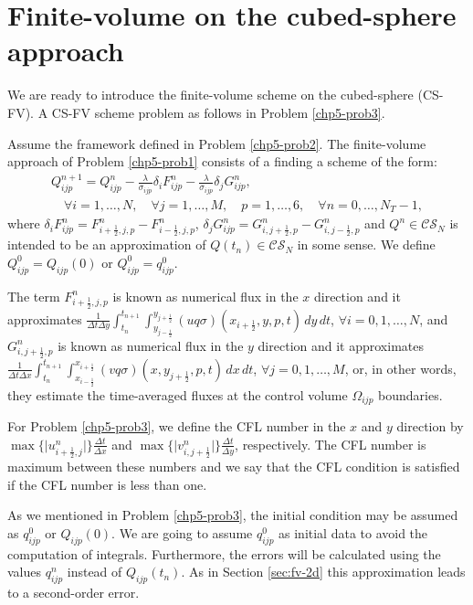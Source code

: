 \section{Finite-volume on the cubed-sphere approach}
\label{chp-cs-fvcs}
We are ready to introduce the finite-volume scheme on the cubed-sphere (CS-FV).
A CS-FV scheme problem as follows in Problem \ref{chp5-prob3}.
\begin{prob}[CS-FV scheme]
	\label{chp5-prob3}
	Assume the framework defined in Problem \ref{chp5-prob2}.
	The finite-volume approach of Problem \ref{chp5-prob1}
	consists of a finding a scheme of the form:
	\begin{align}
		\label{chp5-csfv}
		{Q}_{ijp}^{n+1} =  {Q}_{ijp}^{n} - \frac{\lambda}{\sigma_{ijp}}\delta_i {F}_{ijp}^{n}
		- \frac{\lambda}{\sigma_{ijp}} \delta_j {G}_{ijp}^{n},
		\\ \nonumber \quad \forall i = 1, \ldots, N, \quad \forall j = 1, \ldots, M, \quad p =1, \ldots, 6,
		\quad \forall n = 0, \ldots, N_T-1,
	\end{align}
	where $ \delta_i F_{ijp}^n =
	{F}_{i+\frac{1}{2},j,p}^{n} 
	- {F}_{i-\frac{1}{2},j,p}^{n}$,
	$ \delta_j G_{ijp}^n =
	{G}_{i,j+\frac{1}{2},p}^{n} 
	- {G}_{i,j-\frac{1}{2},p}^{n}$ 
	and ${Q}^{n}\in \mathcal{CS}_N$ is intended to be an approximation
	of ${Q}(t_{n})\in \mathcal{CS}_N$ in some sense. We define ${Q}_{ijp}^{0} = {Q}_{ijp}(0)$ or
	${Q}_{ijp}^{0} = {q}^0_{ijp}$.
	
	The term ${F}_{i+\frac{1}{2}, j, p}^{n}$ is known as numerical flux in the 
	$x$ direction and it approximates
	$\frac{1}{\Delta t \Delta y}\int_{t_n}^{t_{n+1}} 
	\int_{y_{j-\frac{1}{2}}}^{y_{j+\frac{1}{2}}} 
	(uq\sigma)(x_{i+\frac{1}{2}}, y, p, t) \,dy \,dt $,
	$\forall i = 0, 1, \ldots, N$, and 
	${G}_{i, j+\frac{1}{2}, p}^{n}$ is known as numerical flux in the 
	$y$ direction and it approximates
	$\frac{1}{\Delta t \Delta x}\int_{t_n}^{t_{n+1}}  
	\int_{x_{i-\frac{1}{2}}}^{x_{i+\frac{1}{2}}}
	(vq\sigma)(x, y_{j+\frac{1}{2}}, p, t) \,dx \,dt $,
	$\forall j = 0, 1, \ldots, M$,
	or, in other words, they estimate the time-averaged
	fluxes at the control volume $\Omega_{ijp}$ boundaries.
\end{prob}
\begin{remark}
	For Problem \ref{chp5-prob3}, we define the CFL number in the $x$ and $y$ direction
	by $\max \{{|u_{i+\frac{1}{2},j}^n}|\}\frac{\Delta t}{\Delta x}$ and 
	$\max \{ {|v_{i,j+\frac{1}{2}}^n}|\}\frac{\Delta t}{\Delta y}$, respectively.
	The CFL number is maximum between these numbers and we say that the CFL condition is
	satisfied if the CFL number is less than one. 
\end{remark}
As we mentioned in Problem \ref{chp5-prob3}, the initial condition may be assumed as $q_{ijp}^0$ or $Q_{ijp}(0)$.
We are going to assume  $q_{ijp}^0$ as initial data to avoid the computation of integrals.
Furthermore, the errors will be calculated using the values $q_{ijp}^n$ instead of $Q_{ijp}(t_n)$.
As in Section \ref{sec:fv-2d} this approximation leads to a second-order error.

